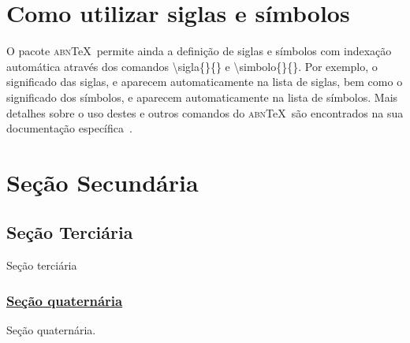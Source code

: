 \section{Como utilizar siglas e símbolos}

O pacote \textsc{abn}\TeX\ permite ainda a defini\c{c}\~ao de siglas e s\'imbolos com indexa\c{c}\~ao autom\'atica atrav\'es dos comandos {\ttfamily \textbackslash sigla\{\}\{\}} e {\ttfamily \textbackslash simbolo\{\}\{\}}. Por exemplo, o significado das siglas, e aparecem automaticamente na lista de siglas, bem como o significado dos s\'imbolos, e aparecem automaticamente na lista de s\'imbolos. Mais detalhes sobre o uso destes e outros comandos do \textsc{abn}\TeX\ s\~ao encontrados na sua documenta\c{c}\~ao espec\'ifica~\cite{abnTeX2009}.


\section{Seção Secundária}

\subsection{Seção Terciária}

Seção terciária \cite{Lamport1986, Kopka2003}

\subsubsection[Seção quaternária]{\underline{Seção quaternária}}

Seção quaternária.
